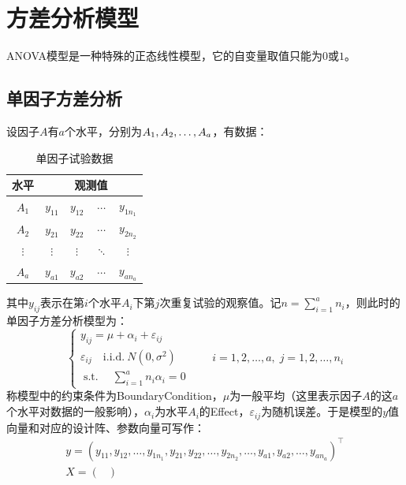 \section{方差分析模型}

\gls{ANOVA}模型是一种特殊的正态线性模型，它的自变量取值只能为$0$或$1$。

\subsection{单因子方差分析}

\begin{definition}
	设因子$A$有$a$个水平，分别为$A_1, A_2, \dots, A_{a}$，有数据：
	\begin{table}[H]
		\centering
		\begin{tabular}{c|cccc}
			\hline
			水平   & \multicolumn{4}{c}{观测值} \\ 
			\hline
			$A_1$    & $y_{11}$ & $y_{12}$  & $\cdots$  & $y_{1n_1}$ \\
			$A_2$    & $y_{21}$ & $y_{22}$  & $\cdots$  & $y_{2n_2}$ \\
			$\vdots$ & $\vdots$ & $\vdots$  & $\ddots$  & $\vdots$   \\
			$A_a$    & $y_{a1}$ & $y_{a2}$  & $\cdots$  & $y_{an_a}$ 
			\\
			\hline
		\end{tabular}
		\caption{单因子试验数据}
	\end{table}
	其中$y_{ij}$表示在第$i$个水平$A_i$下第$j$次重复试验的观察值。记$n=\sum\limits_{i=1}^{a}n_i$，则此时的单因子方差分析模型为：
	\begin{equation*}\label{model:one-way-anova}
		\begin{cases}
			y_{ij}=\mu+\alpha_i+\varepsilon_{ij} \\
			\varepsilon_{ij}\quad\mathrm{i.i.d.~}N(0,\sigma^2) \\
			\operatorname{s.t.}\quad\sum\limits_{i=1}^an_i\alpha_i=0
		\end{cases}
		\qquad i=1,2,\dots,a,\;j=1,2,\dots,n_i
	\end{equation*}
	称模型中的约束条件为\gls{BoundaryCondition}，$\mu$为一般平均（这里表示因子$A$的这$a$个水平对数据的一般影响），$\alpha_i$为水平$A_i$的\gls{Effect}，$\varepsilon_{ij}$为随机误差。于是模型的$y$值向量和对应的设计阵、参数向量可写作：
	\begin{gather*}
		y=(y_{11},y_{12},\dots,y_{1n_1},y_{21},y_{22},\dots,y_{2n_2},\dots,y_{a1},y_{a2},\dots,y_{an_a})^{\top} \\
		X=
		\begin{pmatrix}

\end{pmatrix}
\end{gather*}
\end{definition}
